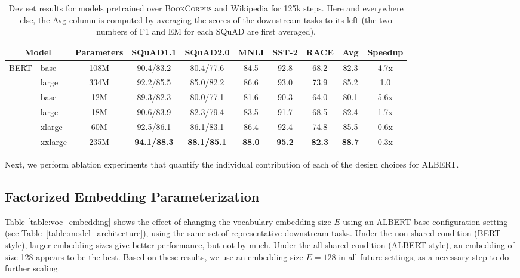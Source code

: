 \begin{table}[!htbp] 
\setlength{\tabcolsep}{5pt}
\small
\centering
\begin{tabular}{ l l | c c c c c c | c | c}
 \multicolumn{2}{c}{Model}    &Parameters        	&SQuAD1.1	&SQuAD2.0	&MNLI	&SST-2	&RACE	&Avg & Speedup\\
\hline
\multirow{3}{*}{BERT} &base	     &108M       &90.4/83.2	&80.4/77.6	&84.5	&92.8	&68.2	&82.3 & 4.7x \\

    &large	        &334M	&92.2/85.5	&85.0/82.2	&86.6	&93.0	&73.9	&85.2 & 1.0\\
\hline 
\multirow{4}{*}{ALBERT}  &base	      &12M    	    &89.3/82.3	&80.0/77.1	&81.6	&90.3	&64.0	&80.1 &5.6x \\
&large	        	 &18M   &90.6/83.9	&82.3/79.4	&83.5	&91.7	&68.5	&82.4 &1.7x\\
&xlarge		   &60M   &92.5/86.1	&86.1/83.1	&86.4	&92.4	&74.8	&85.5 & 0.6x\\
&xxlarge	&235M	& \textbf{94.1/88.3}	&\textbf{88.1/85.1}	&\textbf{88.0}	&\textbf{95.2}	&\textbf{82.3}	&\textbf{88.7} & 0.3x\\
\end{tabular}
\caption{Dev set results for models pretrained over \textsc{BookCorpus} and Wikipedia for 125k steps.
Here and everywhere else, the Avg column is computed by averaging the scores of the downstream tasks to its left (the two numbers of F1 and EM for each SQuAD are first averaged).}
\label{table:overall_comparison}
\end{table}

Next, we perform ablation experiments that quantify the individual contribution of each of the design choices for ALBERT. 

\subsection{Factorized Embedding Parameterization}

Table \ref{table:voc_embedding} shows the effect of changing the vocabulary embedding size $E$ using an ALBERT-base configuration setting (see Table~\ref{table:model_architecture}), using the same set of representative downstream tasks.
Under the non-shared condition (BERT-style), larger embedding sizes give better performance, but not by much.
Under the all-shared condition (ALBERT-style), an embedding of size 128 appears to be the best.
Based on these results, we use an embedding size $E=128$ in all future settings, as a necessary step to do further scaling.

